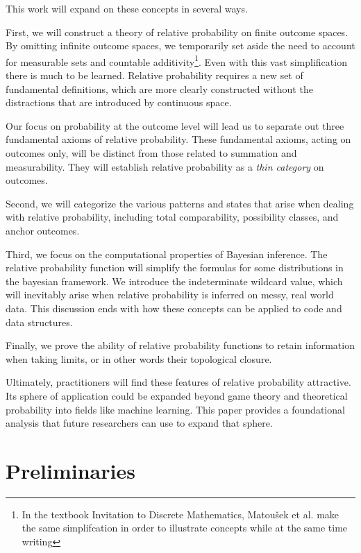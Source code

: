 \documentclass[twoside]{article}
\theoremstyle{plain}%
\theoremstyle{definition}
\theoremstyle{remark}
\begin{document}
This work will expand on these concepts in several ways.

First, we will construct a theory of relative probability on finite outcome spaces. By omitting infinite outcome spaces, we temporarily set aside the need to account for measurable sets and countable additivity\footnote{In the textbook Invitation to Discrete Mathematics, Matoušek et al. make the same simplifcation in order to illustrate concepts while at the same time writing }. Even with this vast simplification there is much to be learned. Relative probability requires a new set of fundamental definitions, which are more clearly constructed without the distractions that are introduced by continuous space.

Our focus on probability at the outcome level will lead us to separate out three fundamental axioms of relative probability. These fundamental axioms, acting on outcomes only, will be distinct from those related to summation and measurability. They will establish relative probability as a \textit{thin category} on outcomes.

Second, we will categorize the various patterns and states that arise when dealing with relative probability, including total comparability, possibility classes, and anchor outcomes. 

Third, we focus on the computational properties of Bayesian inference. The relative probability function will simplify the formulas for some distributions in the bayesian framework. We introduce the indeterminate wildcard value, which will inevitably arise when relative probability is inferred on messy, real world data. This discussion ends with how these concepts can be applied to code and data structures.

Finally, we prove the ability of relative probability functions to retain information when taking limits, or in other words their topological closure.

Ultimately, practitioners will find these features of relative probability attractive. Its sphere of application could be expanded beyond game theory and theoretical probability into fields like machine learning. This paper provides a foundational analysis that future researchers can use to expand that sphere.

\section{Preliminaries}
\end{document}
